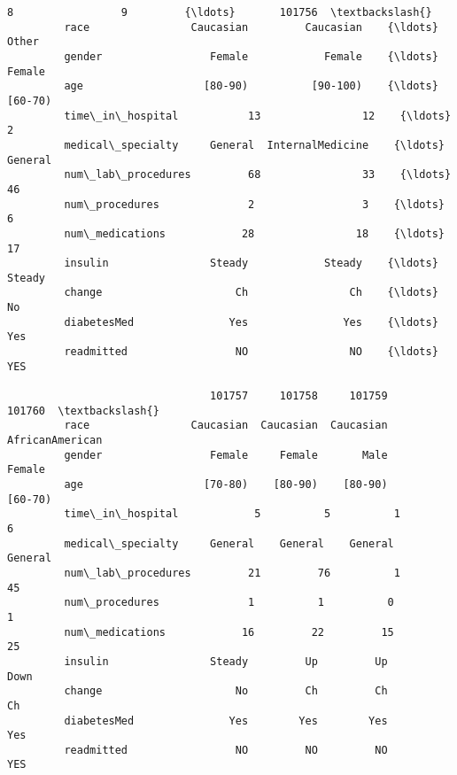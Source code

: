 \documentclass[11pt]{article}
\begin{document}
\begin{Verbatim}[commandchars=\\\{\}]
                                8                 9         {\ldots}       101756  \textbackslash{}
         race                Caucasian         Caucasian    {\ldots}        Other   
         gender                 Female            Female    {\ldots}       Female   
         age                   [80-90)          [90-100)    {\ldots}      [60-70)   
         time\_in\_hospital           13                12    {\ldots}            2   
         medical\_specialty     General  InternalMedicine    {\ldots}      General   
         num\_lab\_procedures         68                33    {\ldots}           46   
         num\_procedures              2                 3    {\ldots}            6   
         num\_medications            28                18    {\ldots}           17   
         insulin                Steady            Steady    {\ldots}       Steady   
         change                     Ch                Ch    {\ldots}           No   
         diabetesMed               Yes               Yes    {\ldots}          Yes   
         readmitted                 NO                NO    {\ldots}          YES   
         
                                101757     101758     101759           101760  \textbackslash{}
         race                Caucasian  Caucasian  Caucasian  AfricanAmerican   
         gender                 Female     Female       Male           Female   
         age                   [70-80)    [80-90)    [80-90)          [60-70)   
         time\_in\_hospital            5          5          1                6   
         medical\_specialty     General    General    General          General   
         num\_lab\_procedures         21         76          1               45   
         num\_procedures              1          1          0                1   
         num\_medications            16         22         15               25   
         insulin                Steady         Up         Up             Down   
         change                     No         Ch         Ch               Ch   
         diabetesMed               Yes        Yes        Yes              Yes   
         readmitted                 NO         NO         NO              YES   
         

\end{Verbatim}
\end{document}
